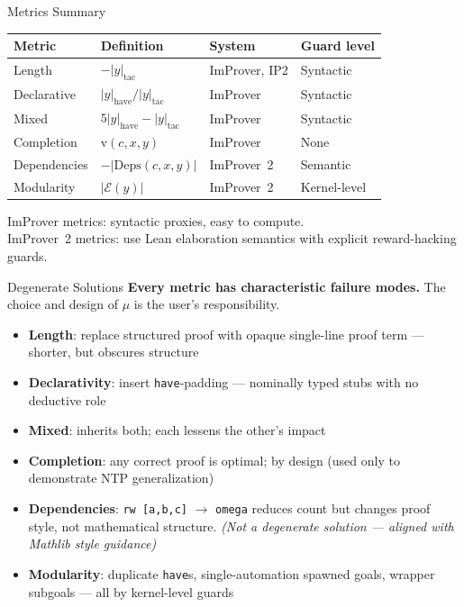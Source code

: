 \begin{frame}{Metrics Summary}
\vspace{0.3em}
\begin{center}
\begin{tabular}{llll}
\toprule
\textbf{Metric} & \textbf{Definition} & \textbf{System} & \textbf{Guard level}\\
\midrule
Length       & $-|y|_{\mathrm{tac}}$                              & ImProver, IP2 & Syntactic\\
Declarative  & $|y|_{\mathrm{have}} / |y|_{\mathrm{tac}}$         & ImProver      & Syntactic\\
Mixed        & $5|y|_{\mathrm{have}} - |y|_{\mathrm{tac}}$        & ImProver      & Syntactic\\
Completion   & $\mathrm{v}(c,x,y)$                                & ImProver      & None\\
\hdashline
Dependencies & $-|\mathrm{Deps}(c,x,y)|$                          & ImProver~2    & Semantic\\
Modularity   & $|\mathcal{E}(y)|$                                  & ImProver~2    & Kernel-level\\
\bottomrule
\end{tabular}
\end{center}
\vspace{0.5em}
\small ImProver metrics: syntactic proxies, easy to compute.\\
ImProver~2 metrics: use Lean elaboration semantics with explicit reward-hacking guards.
\end{frame}

\begin{frame}{Degenerate Solutions}
\vspace{0.3em}
\textbf{Every metric has characteristic failure modes.} The choice and design of $\mu$ is the user's responsibility.
\vspace{0.4em}
\begin{itemize}\setlength{\itemsep}{6pt}
  \item \textbf{Length}: replace structured proof with opaque single-line proof term --- shorter, but obscures structure
  \item \textbf{Declarativity}: insert \texttt{have}-padding --- nominally typed stubs with no deductive role
  \item \textbf{Mixed}: inherits both; each lessens the other's impact
  \item \textbf{Completion}: any correct proof is optimal; by design (used only to demonstrate NTP generalization)
  \item \textbf{Dependencies}: \texttt{rw [a,b,c]} $\to$ \texttt{omega} reduces count but changes proof style, not mathematical structure. \emph{(Not a degenerate solution --- aligned with Mathlib style guidance)}
  \item \textbf{Modularity}: duplicate \texttt{have}s, single-automation spawned goals, wrapper subgoals --- all  by kernel-level guards
\end{itemize}
\end{frame}


